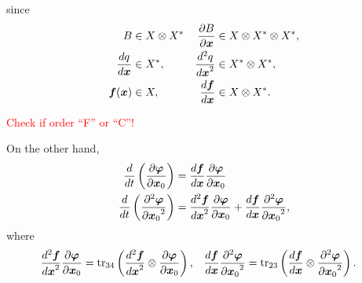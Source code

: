 \documentclass[a4paper]{article}
\newcommand{\deriv}[3][1]{%
    \ifthenelse{\equal{#1}{1}}{\frac{d #2}{d #3}}{\frac{d^#1 #2}{{d #3}^#1}}
}
\newcommand{\pderiv}[3][1]{%
    \ifthenelse{\equal{#1}{1}}{\frac{\partial #2}{\partial #3}}{\frac{\partial^#1 #2}{{\partial #3}^#1}}
}
\newcommand{\parens}[1]{\left(#1\right)}
\newcommand{\tr}{\mathop{\mathrm{tr}}\nolimits}
\newcommand{\traj}{\bm \varphi}
\newcommand{\red}[1]{\textcolor{red}{#1}}
\begin{document}
since
\begin{align}
    \begin{aligned}
        B &\in X \otimes X^* &
        \pderiv{B}{\bm x} &\in X \otimes X^* \otimes X^*,\\
        \deriv{q}{\bm x}&\in X^*, &
        \deriv[2]{q}{\bm x} & \in X^* \otimes X^*,\\
        \bm f(\bm x) &\in X, &
        \deriv{\bm f}{\bm x} &\in X \otimes X^*.
    \end{aligned}
\end{align}

\red{Check if order ``F'' or ``C''!}

On the other hand,
\begin{align}
    \deriv{}{t}
    \parens{\pderiv{\traj}{\bm x_0}}
    &= \deriv{\bm f}{\bm x} \pderiv{\traj}{\bm x_0}\\
    \deriv{}{t}
    \parens{\pderiv[2]{\traj}{\bm x_0}}
    &= \deriv[2]{\bm f}{\bm x} \pderiv{\traj}{\bm x_0}
    +
    \deriv{\bm f}{\bm x} \pderiv[2]{\traj}{\bm x_0},
\end{align}
where
\begin{align}
    \begin{aligned}
        \deriv[2]{\bm f}{\bm x} \pderiv{\traj}{\bm x_0}
        &= \tr_{34} \parens{
            \deriv[2]{\bm f}{\bm x} \otimes \pderiv{\traj}{\bm x_0}
        },
        &
        \deriv{\bm f}{\bm x} \pderiv[2]{\traj}{\bm x_0}
        &=
        \tr_{23} \parens{
            \deriv{\bm f}{\bm x} \otimes \pderiv[2]{\traj}{\bm x_0}
        }.
    \end{aligned}
\end{align}
\end{document}
